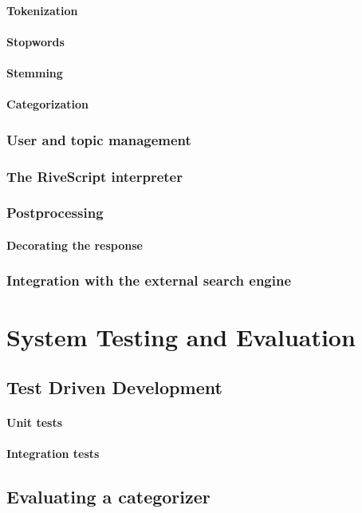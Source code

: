 \documentclass[12pt, twoside, a4paper, draft]{report}
\begin{document}
\subsubsection{Tokenization}
\subsubsection{Stopwords}
\subsubsection{Stemming}
\subsubsection{Categorization}
\subsection{User and topic management}
\subsection{The RiveScript interpreter}
\subsection{Postprocessing}
\subsubsection{Decorating the response}
\subsection{Integration with the external search engine}

\chapter{System Testing and Evaluation}
\section{Test Driven Development}
\subsubsection{Unit tests}
\subsubsection{Integration tests}
\section{Evaluating a categorizer}
\end{document}

